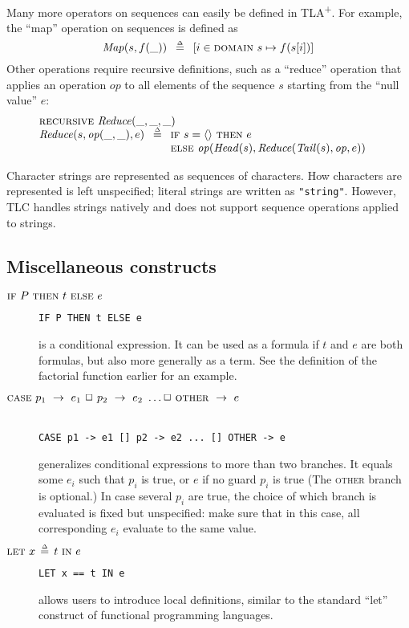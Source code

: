 \documentclass[11pt,fleqn]{article}
\newcommand{\tlaplus}{TLA\textsuperscript{+}\xspace}
\newcommand{\kw}[1]{\textnormal{\textsc{#1}}}
\newcommand{\deq}{\,\mathrel{\smash{\stackrel{\scriptscriptstyle\Delta}{=}}}\,}
\newcommand{\seq}[1]{\ensuremath{\langle #1 \rangle}}
\newcommand{\DOMAIN}{\kw{domain}}
\newcommand{\IF}{\kw{if}}
\newcommand{\THEN}{\kw{then}}
\newcommand{\ELSE}{\kw{else}}
\newcommand{\LET}{\kw{let}}
\newcommand{\IN}{\kw{in}}
\newcommand{\CASE}{\kw{case}}
\newcommand{\OTHER}{\kw{other}}
\newcommand{\RECURSIVE}{\kw{recursive}}
\begin{document}
Many more operators on sequences can easily be defined in \tlaplus. For example,
the ``map'' operation on sequences is defined as
\[
  \mathit{Map}(s, f(\_))\ \deq\
  [i \in \DOMAIN~s \mapsto f(s[i])]
\]
Other operations require recursive definitions, such as a ``reduce'' operation
that applies an operation $op$ to all elements of the sequence $s$ starting from
the ``null value'' $e$:
\[\begin{array}{@{}l}
    \RECURSIVE\ \mathit{Reduce}(\_,\_,\_)\\
    \mathit{Reduce}(s, \mathit{op}(\_,\_), e)\ \deq\
    \begin{array}[t]{@{}l}
      \IF\ s = \seq{}\ \THEN\ e\\
      \ELSE\ \mathit{op}(\mathit{Head}(s), \mathit{Reduce}(\mathit{Tail}(s), \mathit{op}, e))
    \end{array}
\end{array}\]

Character strings are represented as sequences of characters. How characters are
represented is left unspecified; literal strings are written as \verb|"string"|.
However, TLC handles strings natively and does not support sequence operations
applied to strings.


\subsection{Miscellaneous constructs}

\begin{description}
\item[$\IF\ P\ \THEN\ t\ \ELSE\ e$]\qquad \verb|IF P THEN t ELSE e|

  is a conditional expression. It can be used as a formula if $t$ and $e$ are
  both formulas, but also more generally as a term. See the definition of the
  factorial function earlier for an example.
  
\item[$\CASE\ p_1\ \rightarrow\ e_1\ \Box\ p_2\ \rightarrow\ e_2\ \dots \Box\ \OTHER\ \rightarrow\ e$]\mbox{}\\
  \verb|CASE p1 -> e1 [] p2 -> e2 ... [] OTHER -> e|

  generalizes conditional expressions to more than two branches. It equals some
  $e_i$ such that $p_i$ is true, or $e$ if no guard $p_i$ is true (The \OTHER{}
  branch is optional.) In case several $p_i$ are true, the choice of which
  branch is evaluated is fixed but unspecified: make sure that in this case, all
  corresponding $e_i$ evaluate to the same value.
  
\item[$\LET\ x \deq t\ \IN\ e$]\qquad \verb|LET x == t IN e|

  allows users to introduce local definitions, similar to the standard ``let''
  construct of functional programming languages.
\end{description}
\end{document}
